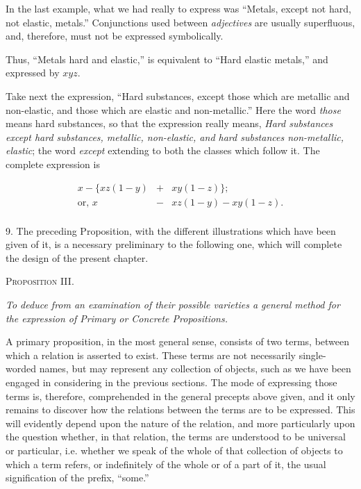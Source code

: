 \documentclass[oneside]{book}
\begin{document}
In the last example, what we had really to express was ``Metals,
except not hard, not elastic, metals.'' Conjunctions used between
\textit{adjectives} are usually superfluous, and, therefore, must
not be expressed symbolically.

Thus, ``Metals hard and elastic,'' is equivalent to ``Hard
elastic metals,'' and expressed by $xyz$.

Take next the expression, ``Hard substances, except those
which are metallic and non-elastic, and those which are elastic
and non-metallic.'' Here the word \textit{those} means hard substances,
so that the expression really means, \textit{Hard substances except hard
substances, metallic, non-elastic, and hard substances non-metallic,
elastic}; the word \textit{except} extending to both the classes which
follow it. The complete expression is

\begin{eqnarray*}
x - \{xz (1 - y) &+& xy (1 - z)\};\\
\textrm{or, } x &-& xz (1 - y) - xy (1 - z).\\
\end{eqnarray*}

9. The preceding Proposition, with the different illustrations
which have been given of it, is a necessary preliminary to the
following one, which will complete the design of the present
chapter.

\begin{center}
\textsc{Proposition III}.
\end{center}

\textit{To deduce from an examination of their possible varieties a general
method for the expression of Primary or Concrete Propositions.}

A primary proposition, in the most general sense, consists of
two terms, between which a relation is asserted to exist. These
terms are not necessarily single-worded names, but may represent
any collection of objects, such as we have been engaged in considering
in the previous sections. The mode of expressing those
terms is, therefore, comprehended in the general precepts above
given, and it only remains to discover how the relations between
the terms are to be expressed. This will evidently depend upon
the nature of the relation, and more particularly upon the question
whether, in that relation, the terms are understood to be
universal or particular, i.e. whether we speak of the whole of
that collection of objects to which a term refers, or indefinitely of
the whole or of a part of it, the usual signification of the prefix,
``some.''
\end{document}
